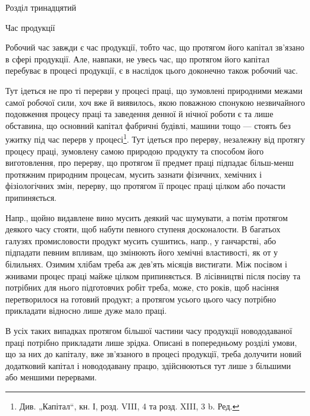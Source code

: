 Розділ тринадцятий

Час продукції

Робочий час завжди є час продукції, тобто час, що протягом його
капітал зв’язано в сфері продукції. Але, навпаки, не увесь час, що протягом
його капітал перебуває в процесі продукції, є в наслідок цього
доконечно також робочий час.

Тут ідеться не про ті перерви у процесі праці, що зумовлені природними
межами самої робочої сили, хоч вже й виявилось, якою поважною
спонукою незвичайного подовження процесу праці та заведення
денної й нічної роботи є та лише обставина, що основний капітал
фабричні будівлі, машини тощо — стоять без ужитку під час перерв у процесі\footnote*{
Див. „Капітал“, кн. І, розд. VIII, 4 та розд. XIII, 3 b. Ред.
}.
Тут ідеться про перерву, незалежну від протягу процесу праці,
зумовлену самою природою продукту та способом його виготовлення,
про перерву, що протягом її предмет праці підпадає більш-менш протяжним
природним процесам, мусить зазнати фізичних, хемічних і фізіологічних
змін, перерву, що протягом її процес праці цілком або почасти
припиняється.

Напр., щойно видавлене вино мусить деякий час шумувати, а потім
протягом деякого часу стояти, щоб набути певного ступеня досконалости.
В багатьох галузях промисловости продукт мусить сушитись, напр., у
ганчарстві, або підпадати певним впливам, що змінюють його хемічні
властивості, як от у білильнях. Озимим хлібам треба аж дев’ять місяців
вистигати. Між посівом і жнивами процес праці майже цілком припиняється.
В лісівництві після посіву та потрібних для нього підготовчих
робіт треба, може, сто років, щоб насіння перетворилося на готовий продукт;
а протягом усього цього часу потрібно прикладати відносно лише
дуже мало праці.

В усіх таких випадках протягом більшої частини часу продукції новододаваної
праці потрібно прикладати лише зрідка. Описані в попередньому
розділі умови, що за них до капіталу, вже зв’язаного в процесі
продукції, треба долучити новий додатковий капітал і новододавану працю,
здійснюються тут лише з більшими або меншими перервами.

